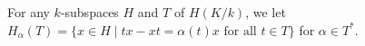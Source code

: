 For any $k$-subspaces $H$ and $T$ of $H(K/k)$, we let $H_\alpha(T) = \{x \in H \mid tx - xt = \alpha(t)x \text{ for all } t \in T\}$ for $\alpha \in T^*$.
